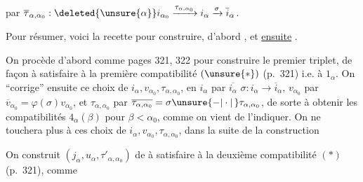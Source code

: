 
par  $\overline{\tau}_{\alpha,\alpha_0}:\deleted{\unsure{\alpha}}i_{\alpha_0}\xrightarrow{\tau_{\alpha,\alpha_0}}i_\alpha\xrightarrow{\sigma}\overline{i}_\alpha$.

Pour résumer, voici la recette pour construire, d'abord , et \uline{ensuite} .

On procède d'abord comme pages 321, 322 pour construire le premier triplet, de façon à satisfaire à la première compatibilité $(\unsure{*})$ (p.~321) i.e. à $1_\alpha$.
On ``corrige'' ensuite ce choix de $i_\alpha,v_{\alpha_0},\tau_{\alpha,\alpha_0}$, en  $i_\alpha$ par $\overline{i_\alpha}$  $\sigma:i_\alpha\to\overline{i}_\alpha$, $v_{\alpha_0}$ par $\overline{v}_{\alpha_0}=\varphi(\sigma)v_{\alpha_0}$, et $\tau_{\alpha,\alpha_0}$ par $\overline{\tau_{\alpha,\alpha_0}}=\sigma\unsure{-|\cdot|\,}\tau_{\alpha,\alpha_0}$, de sorte à obtenir les compatibilités $4_\alpha(\beta)$ pour $\beta<\alpha_0$, comme on vient de l'indiquer.
On ne touchera plus à ces choix de $i_\alpha,v_{\alpha_0},\tau_{\alpha,\alpha_0}$, dans la suite de la construction

On construit $(j_\alpha,u_\alpha,\tau'_{\alpha,\alpha_0})$ de  à satisfaire à la deuxième compatibilité $(*)$ (p.~321), comme
